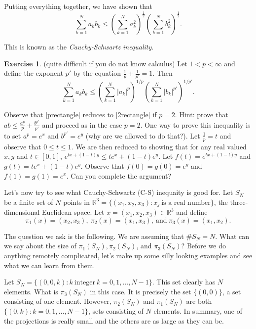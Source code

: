 \documentclass[]{stml-l}
\numberwithin{equation}{chapter}
\theoremstyle{plain}
\theoremstyle{definition}
\newtheorem{exercise}{Exercise}[chapter]
\theoremstyle{remark}
\begin{document}
Putting everything together, we have shown that
\begin{equation} \label{2rectangle} \sum_{k=1}^N a_k b_k \leq {\left(\sum_{k=1}^N a_k^2
\right)}^{\frac{1}{2}} {\left(\sum_{k=1}^N b_k^2
\right)}^{\frac{1}{2}}. \end{equation}

This is known as the \emph{Cauchy-Schwartz inequality}.

\begin{exercise} (quite difficult if you do not know calculus) Let
$1<p<\infty$ and define the exponent $p'$ by
the equation $\frac{1}{p}+\frac{1}{p'}=1$. Then
\begin{equation} \label{prectangle}
\sum_{k=1}^N a_k b_k \leq {\left(\sum_{k=1}^N {|a_k|}^p
\right)}^{1/p} {\left(\sum_{k=1}^N {|b_k|}^{p'}
\right)}^{1/p'}. 
\end{equation} \end{exercise}

Observe that \ref{prectangle} reduces to \ref{2rectangle} if $p=2$. Hint: prove that
$ab \leq \frac{a^p}{p}+\frac{b^{p'}}{p'}$ and proceed as in the
case $p=2$. One way to prove this inequality is to set $a^p=e^x$
and $b^{p'}=e^y$ (why are we allowed to do that?). Let
$\frac{1}{p}=t$ and observe that $0 \leq t \leq 1$. We are then
reduced to showing that for any real valued $x,y$ and $t \in
[0,1]$, $e^{tx+(1-t)y} \leq te^x+(1-t)e^y$. Let
$f(t)=e^{tx+(1-t)y}$ and $g(t)=te^x+(1-t)e^y$. Observe that
$f(0)=g(0)=e^y$ and $f(1)=g(1)=e^x$. Can you complete the
argument?



Let's now try to see what
Cauchy-Schwartz (C-S) inequaity is good for. Let $S_N$ be a finite set of
$N$ points in ${\mathbb R}^3=\{(x_1,x_2,x_3): x_j \ \text{is a real
number}\}$, the three-dimensional Euclidean space. Let $x=(x_1,x_2,x_3)
\in {\mathbb R}^3$ and define
$$ \pi_1(x)=(x_2,x_3), \ \pi_2(x)=(x_1,x_3), \ \text{and} \
\pi_3(x)=(x_1,x_2).$$

The question we ask is the following. We are assuming that $\# S_N=N$.
What can we say about the size of $\pi_1(S_N), \pi_2(S_N)$, and
$\pi_3(S_N)$? Before we do anything remotely complicated, let's make up
some silly looking examples and see what we can learn from them.

Let $S_N=\{(0,0,k): k \ \text{integer} \ k=0,1, \dots, N-1\}$. This set
clearly has $N$ elements. What is $\pi_3(S_N)$ in this case. It is
precisely the set $\{(0,0)\}$, a set consisting of one element. However,
$\pi_2(S_N)$ and $\pi_1(S_N)$ are both $\{(0,k): k=0,1,\dots,N-1\}$,
sets consisting of $N$ elements. In summary, one of the projections is
really small and the others are as large as they can be.
\end{document}
